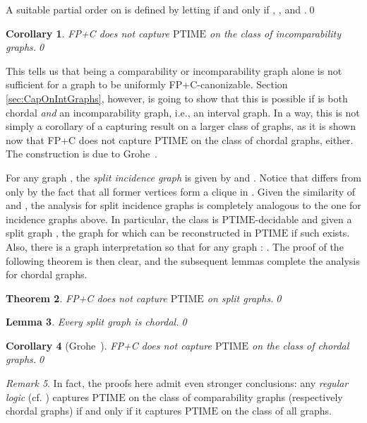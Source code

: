 \documentclass[10pt]{article}
\newtheorem{thm}{Theorem}[section]
\newtheorem{cor}[thm]{Corollary}
\newtheorem{lem}[thm]{Lemma}
\theoremstyle{remark}
\newtheorem{remark}[thm]{Remark}
\theoremstyle{definition}
\theoremstyle{plain}
\newcommand{\logic}[1]{\textsf{\upshape\relsize{-0.5}#1}\xspace}
\newcommand{\FPC}{\logic{FP+C}}
\newcommand{\cclass}[1]{\ensuremath{\mathrm{#1}}\xspace}
\newcommand{\PTIME}{\cclass{PTIME}}
\begin{document}
\proof A suitable partial order  on  is defined by letting  if and only if , , and .\qed

\begin{cor}
 \FPC does not capture \PTIME on the class of incomparability graphs.\qed
\end{cor}


This tells us that being a comparability or incomparability graph alone is not sufficient for a graph  to be uniformly \FPC-canonizable. Section \ref{sec:CapOnIntGraphs}, however, is going to show that this is possible if  is both chordal \emph{and} an incomparability graph, i.e., an interval graph. In a way, this is not simply a corollary of a capturing result on a larger class of graphs, as it is shown now that \FPC does not capture \PTIME on the class of chordal graphs, either. The construction is due to Grohe~\cite{grohe09fixed-point}.


For any graph , the \emph{split incidence graph}  is given by  and . Notice that  differs from  only by the fact that all former vertices  form a clique in . 
Given the similarity of  and , the analysis for split incidence graphs is completely analogous to the one for incidence graphs above. In particular, the class  is \PTIME-decidable and given a split graph , the graph  for which  can be reconstructed in \PTIME if such  exists. Also, there is a graph interpretation  so that for any graph : . The proof of the following theorem is then clear, and the subsequent lemmas complete the analysis for chordal graphs.

\begin{thm}\FPC does not capture \PTIME on split graphs.\qed
\end{thm}


\begin{lem}
Every split graph  is chordal.\qed
\end{lem}


\begin{cor}[Grohe~\cite{grohe09fixed-point}]
 \FPC does not capture \PTIME on the class of chordal graphs.\qed
\end{cor}

\begin{remark} \label{rem:strongerConclusion}
In fact, the proofs here admit even stronger conclusions: any \emph{regular logic} (cf. \cite{ebbinghaus94mathematical}) captures \PTIME on the class of comparability graphs (respectively chordal graphs) if and only if it captures \PTIME on the class of all graphs.
\end{remark}
\end{document}
